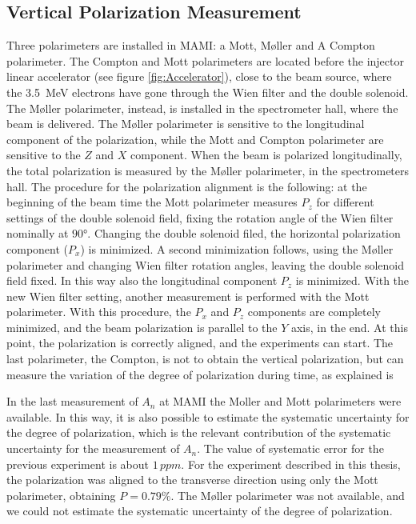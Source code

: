 \subsection{Vertical Polarization Measurement}
Three polarimeters are installed in MAMI: a Mott, M\o ller and A Compton polarimeter. The Compton and Mott polarimeters are located before the injector linear accelerator (see figure \ref{fig:Accelerator}), close to the beam source, where the \SI{3.5}{\mega \electronvolt} electrons have gone through the Wien filter and the double solenoid. The M\o ller polarimeter, instead, is installed in the spectrometer hall, where the beam is delivered. The M\o ller polarimeter is sensitive to the longitudinal component of the polarization, while the Mott and Compton polarimeter are sensitive to the $Z$ and $X$ component. 
When the beam is polarized longitudinally, the total polarization is measured by the M\o ller polarimeter, in the spectrometers hall. The procedure for the polarization alignment is the following: at the beginning of the beam time the Mott polarimeter measures $P_{z}$ for different settings of the double solenoid field, fixing the rotation angle of the Wien filter nominally at $\ang{90}$. Changing the double solenoid filed, the horizontal polarization component ($P_{x}$) is minimized. A second minimization follows, using the M\o ller polarimeter and changing Wien filter rotation angles, leaving the double solenoid field fixed. In this way also the longitudinal component $P_{z}$ is minimized. With the new Wien filter setting, another measurement is performed with the Mott polarimeter. With this procedure, the $P_{x}$ and $P_{z}$ components are completely minimized, and the beam polarization is parallel to the $Y$ axis, in the end.
At this point, the polarization is correctly aligned, and the experiments can start. The last polarimeter, the Compton, is not to obtain the vertical polarization, but can measure the variation of the degree of polarization during time, as explained is \cite{Schlimme:2016rrp} 

In the last measurement of $A_{n}$ at MAMI \cite{Esser:2018vdp} the Moller and Mott polarimeters were available. In this way, it is also possible to estimate the systematic uncertainty for the degree of polarization, which is the relevant contribution of the systematic uncertainty for the measurement of $A_{n}$. The value of systematic error for the previous experiment is about $1 \, ppm$. For the experiment described in this thesis, the polarization was aligned to the transverse direction using only the Mott polarimeter, obtaining $P = 0.79\%$. The M\o ller polarimeter was not available, and we could not estimate the systematic uncertainty of the degree of polarization.

